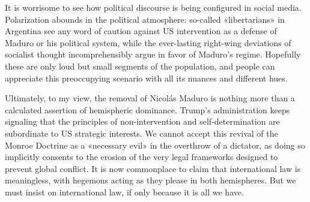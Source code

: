 \documentclass[a4paper, 12pt]{article}
\begin{document}
It is worrisome to see how political discourse is being configured in social
media. Polarization abounds in the political atmosphere: so-called
«libertarians» in Argentina see any word of caution against US intervention as a
defense of Maduro or his political system, while the ever-lasting right-wing
deviations of socialist thought incomprehensibly argue in favor of Maduro's
regime. Hopefully these are only loud but small segments of the population, and
people can appreciate this preoccupying scenario with all its nuances and
different hues. 

Ultimately, to my view, the removal of Nicolás Maduro is nothing more than a
calculated assertion of hemispheric dominance. Trump's administration keeps
signaling that the principles of non-intervention and self-determination are
subordinate to US strategic interests. We cannot accept this revival of the
Monroe Doctrine as a «necessary evil» in the overthrow of a dictator, as doing
so implicitly consents to the erosion of the very legal frameworks designed to
prevent global conflict. It is now commonplace to claim that international law
is meaningless, with hegemons acting as they please in both hemispheres. But we
must insist on international law, if only because it is all we have.
\end{document}
